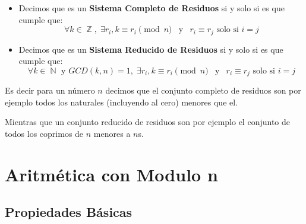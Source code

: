 \documentclass[12pt, fleqn]{report}                             %
\DeclareMathOperator \Space {\quad}                             %
\DeclareMathOperator \MiniSpace {\;}                            %
\newcommand \Also {\MiniSpace \text{y} \MiniSpace}              %
\DeclareMathOperator \Naturals  {\mathbb{N}}                     %
\DeclareMathOperator \Integers  {\mathbb{Z}}                     %
\begin{document}
            \begin{itemize}
                \item Decimos que es un \textbf{Sistema Completo de Residuos}
                    si y solo si es que cumple que:
                    \begin{equation*}
                        \forall k \in \Integers, \; \exists r_i, k \equiv r_i \pmod{n} 
                        \Also
                        r_i \equiv r_j \text{ solo si } i = j 
                    \end{equation*}

                \item Decimos que es un \textbf{Sistema Reducido de Residuos}
                    si y solo si es que cumple que:
                    \begin{equation*}
                        \forall k \in \Naturals \text{ y } GCD(k, n) = 1, \; 
                            \exists r_i, k \equiv r_i \pmod{n} 
                        \Also
                        r_i \equiv r_j \text{ solo si } i = j 
                    \end{equation*}
            \end{itemize}

            Es decir para un número $n$ decimos que el conjunto completo de residuos
            son por ejemplo todos los naturales (incluyendo al cero) menores que el.

            Mientras que un conjunto reducido de residuos son por ejemplo el conjunto
            de todos los coprimos de $n$ menores a $n$s.



    \clearpage
    \section{Aritmética con Modulo n}


        \subsection{Propiedades Básicas}
\end{document}
